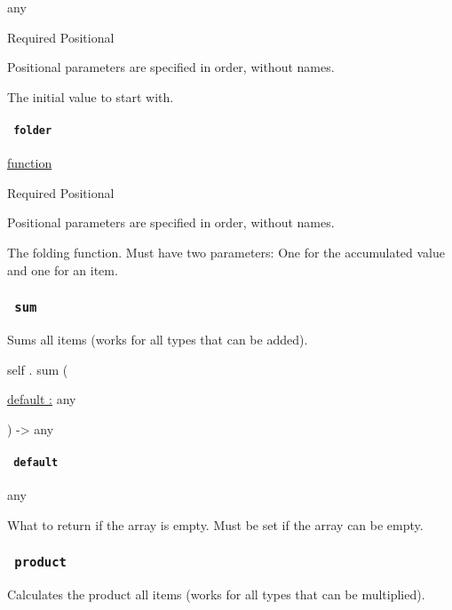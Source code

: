 { any }

{Required} {{ Positional }}

\label{definitions-fold-init-positional-tooltip}
Positional parameters are specified in order, without names.

The initial value to start with.

\paragraph{\texorpdfstring{\texttt{\ folder\ }}{ folder }}\label{definitions-fold-folder}

\href{/docs/reference/foundations/function/}{function}

{Required} {{ Positional }}

\label{definitions-fold-folder-positional-tooltip}
Positional parameters are specified in order, without names.

The folding function. Must have two parameters: One for the accumulated
value and one for an item.

\subsubsection{\texorpdfstring{\texttt{\ sum\ }}{ sum }}\label{definitions-sum}

Sums all items (works for all types that can be added).

self { . } { sum } (

{ \hyperref[definitions-sum-parameters-default]{default :} { any } }

) -\textgreater{} { any }

\paragraph{\texorpdfstring{\texttt{\ default\ }}{ default }}\label{definitions-sum-default}

{ any }

What to return if the array is empty. Must be set if the array can be
empty.

\subsubsection{\texorpdfstring{\texttt{\ product\ }}{ product }}\label{definitions-product}

Calculates the product all items (works for all types that can be
multiplied).

